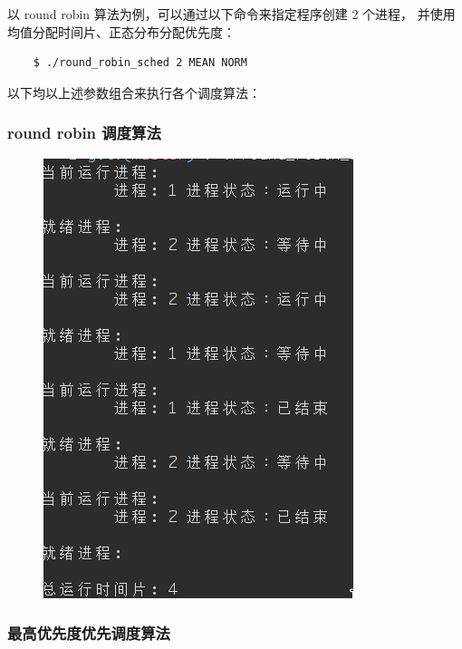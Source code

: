 \documentclass[12bp]{guo}
\begin{document}
以 round robin 算法为例，可以通过以下命令来指定程序创建 2 个进程，
并使用均值分配时间片、正态分布分配优先度：

\begin{verbatim}
    $ ./round_robin_sched 2 MEAN NORM
\end{verbatim}

以下均以上述参数组合来执行各个调度算法：

\subsubsection{round robin 调度算法}

\begin{figure}[h!]
    \centering
        \includegraphics[scale=0.75]{figures/1.rr.png}
\end{figure}

\clearpage

\subsubsection{最高优先度优先调度算法}
\end{document}
